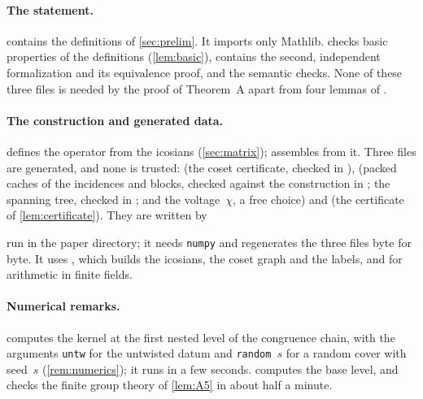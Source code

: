\paragraph{The statement.}  contains the definitions of \cref{sec:prelim}. It imports only Mathlib.
 checks basic properties of the definitions (\cref{lem:basic}),  contains the second,
independent formalization and its equivalence proof, and  the semantic checks. None of these
three files is needed by the proof of Theorem~A apart from four lemmas of .

\paragraph{The construction and generated data.}  defines the operator from the icosians
(\cref{sec:matrix});  assembles  from it. Three files are generated, and none is
trusted:  (the coset certificate, checked in ),  (packed caches
of the incidences and blocks, checked against the construction in ; the spanning tree, checked in
; and the voltage~$\chi$, a free choice) and  (the certificate of
\cref{lem:certificate}). They are written by
\begin{center}
\end{center}
run in the paper directory; it needs \texttt{numpy} and regenerates the three files byte for byte. It uses
, which builds the icosians, the coset graph and the labels, and  for
arithmetic in finite fields.

\paragraph{Numerical remarks.}  computes the kernel at the first nested level of the
congruence chain, with the arguments \texttt{untw} for the untwisted datum and \texttt{random}~$s$ for a random cover
with seed~$s$ (\cref{rem:numerics}); it runs in a few seconds.  computes the base
level, and  checks the finite group theory of \cref{lem:A5} in about half a minute.

